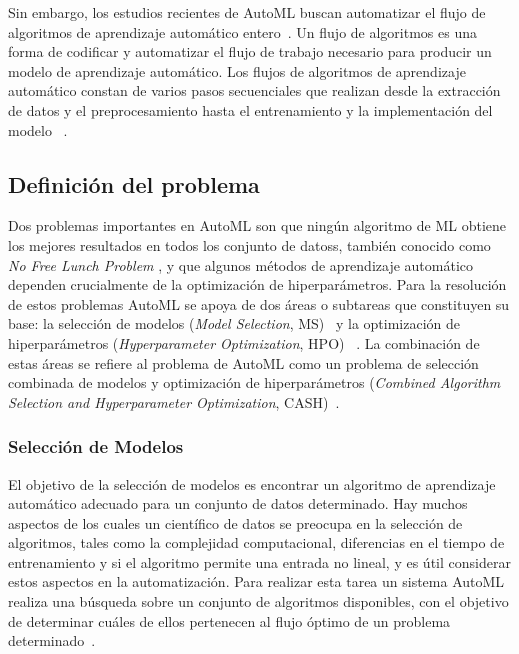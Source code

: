Sin embargo, los estudios recientes de AutoML buscan automatizar el flujo de
algoritmos de aprendizaje automático entero~. Un flujo de algoritmos es una forma de codificar y
automatizar el flujo de trabajo necesario para producir un modelo de
aprendizaje automático. Los flujos de algoritmos de aprendizaje automático
constan de varios pasos secuenciales que realizan desde la extracción de datos
y el preprocesamiento hasta el entrenamiento y la implementación del modelo
~\cite{web-mlpipe}.

\subsection{Definición del problema}\label{subsec:automl_problem_definition}

Dos problemas importantes en AutoML son que ningún algoritmo de ML obtiene los
mejores resultados en todos los conjunto de datoss, también conocido como
\textit{No Free Lunch Problem} \cite{wolpert1995no}, y que algunos métodos de
aprendizaje automático dependen crucialmente de la optimización de
hiperparámetros. Para la resolución de estos problemas AutoML se apoya de dos
áreas o subtareas que constituyen su base: la selección de modelos
(\textit{Model Selection}, MS)~\cite{thornton2013auto} y la optimización de
hiperparámetros (\textit{Hyperparameter Optimization}, HPO)
~\cite{fuerer2019hyperparameter}. La combinación de estas áreas se refiere al
problema de AutoML como un problema de selección combinada de modelos y
optimización de hiperparámetros (\textit{Combined Algorithm Selection and
Hyperparameter Optimization}, CASH)~\cite{thornton2013auto}.

\subsubsection{Selección de Modelos}

El objetivo de la selección de modelos es encontrar un algoritmo de aprendizaje
automático adecuado para un conjunto de datos determinado. Hay muchos aspectos de los
cuales un científico de datos se preocupa en la selección de algoritmos, tales
como la complejidad computacional, diferencias en el tiempo de entrenamiento y
si el algoritmo permite una entrada no lineal, y es útil considerar estos
aspectos en la automatización. Para realizar esta tarea un sistema AutoML
realiza una búsqueda sobre un conjunto de algoritmos disponibles, con el
objetivo de determinar cuáles de ellos pertenecen al flujo óptimo de un
problema determinado~\cite{li2021automl}.

